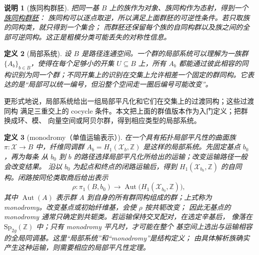 \documentclass[UTF8,fontset=none,a4paper,11pt]{ctexart}
\theoremstyle{foundation-definition}
\newtheorem{definition}{定义}[section]
\theoremstyle{foundation-theorem}
\theoremstyle{foundation-proposition}
\theoremstyle{foundation-example}
\theoremstyle{foundation-remark}
\newtheorem{remark}[definition]{说明}
\theoremstyle{foundation-theorem}
\newcommand{\term}[2]{\hyperref[#1]{#2}}
\begin{document}
\begin{remark}[族同构群胚]\label{rem:family-isomorphism-groupoid}
把同一基 \(B\) 上的族作为对象、族同构作为态射，得到一个\term{rem:family-isomorphism-groupoid}{族同构群胚}：
族同构可以逐点取逆，所以满足上面群胚的可逆性条件。若只取族的同构类，就只得到一个集合；
而群胚还保留每个族的自同构群以及族之间的全部可逆同构。这正是粗模分类可能丢失的对称性信息。
\end{remark}

\begin{definition}[局部系统]\label{def:local-system}
设 \(B\) 是路径连通空间。一个群的局部系统可以理解为一族群
\(\{A_b\}_{b\in B}\)，使得在每个足够小的开集 \(U\subseteq B\) 上，所有
\(A_b\) 都能通过彼此相容的同构识别为同一个群；不同开集上的识别在交集上允许相差一个固定的群同构。它表达的是“局部可以统一编号，但沿整个空间走一圈后编号可能改变”。
\end{definition}

更形式地说，局部系统给出一组局部平凡化和它们在交集上的过渡同构；这些过渡同构
满足三重交上的 cocycle 条件。本文把上面的群值版本作为入门定义；把群换成环、模、
向量空间或阿贝尔群，得到相应类型的局部系统。

\begin{definition}[monodromy（单值运输表示）]\label{def:monodromy}
在一个具有拓扑局部平凡性的曲面族 \(\pi:\mathcal X\to B\) 中，纤维同调群
\(A_b=H_1(\mathcal X_b,\mathbb Z)\) 是这样的局部系统。先固定基点 \(b_0\)，再为每条
从 \(b_0\) 到 \(b\) 的路径选择局部平凡化所给出的运输；改变运输路径一般会改变结果。
沿以 \(b_0\) 为起点和终点的闭路运输后，得到
\(H_1(\mathcal X_{b_0},\mathbb Z)\) 的自同构。闭路按同伦类取商后给出表示
\[
\rho:\pi_1(B,b_0)\longrightarrow
\operatorname{Aut}\bigl(H_1(\mathcal X_{b_0},\mathbb Z)\bigr),
\]
其中 \(\operatorname{Aut}(A)\) 表示群 \(A\) 到自身的所有群同构组成的群；上式称为
monodromy。改变基点或初始纤维基，会使 \(\rho\) 按共轭改变；
因此无基点的 monodromy 通常只确定到共轭类。若运输保持交叉配对，在选定辛基后，
像落在 \(\mathrm{Sp}_{2g}(\mathbb Z)\) 中；只有 monodromy 平凡时，才可能在整个
基空间上选出与运输相容的全局同调基。这里“局部系统”和“monodromy”是结构定义；
由具体解析族确实产生这种运输，则需要相应的局部平凡性定理。
\end{definition}
\end{document}

